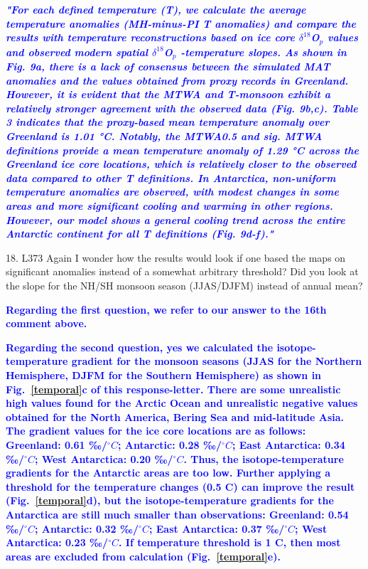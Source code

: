 \documentclass[gmd, manuscript]{copernicus}
\begin{document}
\textcolor{blue}{\textbf{\textit{"For each defined temperature (T), we calculate the average temperature anomalies (MH-minus-PI T anomalies) and compare the results with temperature reconstructions based on ice core $\delta^{18}$O$_p$  values and observed modern spatial $\delta^{18}$O$_p$ -temperature slopes. As shown in Fig. 9a, there is a lack of consensus between the simulated MAT anomalies and the values obtained from proxy records in Greenland. However, it is evident that the MTWA and T-monsoon exhibit a relatively stronger agreement with the observed data (Fig. 9b,c). Table 3 indicates that the proxy-based mean temperature anomaly over Greenland is 1.01 °C. Notably, the MTWA0.5 and sig. MTWA definitions provide a mean temperature anomaly of 1.29 °C across the Greenland ice core locations, which is relatively closer to the observed data compared to other T definitions. In Antarctica, non-uniform temperature anomalies are observed, with modest changes in some areas and more significant cooling and warming in other regions. However, our model shows a general cooling trend across the entire Antarctic continent for all T definitions (Fig. 9d-f)."}}}



18. L373 Again I wonder how the results would look if one based the maps on significant anomalies instead of a somewhat arbitrary threshold? Did you look at the slope for the NH/SH monsoon season (JJAS/DJFM) instead of annual mean?

\medskip

\textcolor{blue}{\textbf{Regarding the first question, we refer to our answer to the 16th comment above. }}

\medskip

\textcolor{blue}{\textbf{Regarding the second question, yes we calculated the isotope-temperature gradient for the monsoon seasons (JJAS for the Northern Hemisphere, DJFM for the Southern Hemisphere) as shown in Fig.~\ref{temporal}c of this response-letter. There are some unrealistic high values found for the Arctic Ocean and unrealistic negative values obtained for the North America, Bering Sea and mid-latitude Asia. The gradient values for the ice core locations are as follows: Greenland: 0.61 ‰/$^{\circ}C$; Antarctic: 0.28 ‰/$^{\circ}C$; East Antarctica: 0.34 ‰/$^{\circ}C$; West Antarctica: 0.20 ‰/$^{\circ}C$. Thus, the isotope-temperature gradients for the Antarctic areas are too low. Further applying a threshold for the temperature changes (0.5 C) can improve the result (Fig.~\ref{temporal}d), but the isotope-temperature gradients for the Antarctica are still much smaller than observations: Greenland: 0.54 ‰/$^{\circ}C$; Antarctic: 0.32 ‰/$^{\circ}C$; East Antarctica: 0.37 ‰/$^{\circ}C$; West Antarctica: 0.23 ‰/$^{\circ}C$.  If temperature threshold is 1 C, then most areas are excluded from calculation (Fig.~\ref{temporal}e).}}
\end{document}
